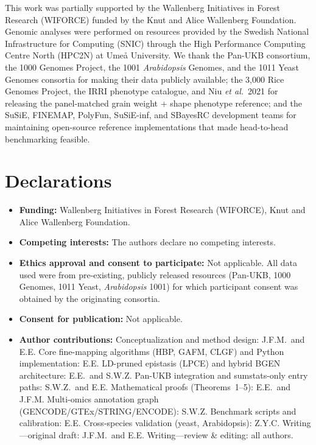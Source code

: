 \documentclass[pdflatex,sn-nature]{sn-jnl}
\begin{document}

This work was partially supported by the Wallenberg Initiatives in
Forest Research (WIFORCE) funded by the Knut and Alice Wallenberg
Foundation. Genomic analyses were performed on resources provided by
the Swedish National Infrastructure for Computing (SNIC) through the
High Performance Computing Centre North (HPC2N) at Ume\aa{}
University. We thank the Pan-UKB consortium, the 1000 Genomes
Project, the 1001 \emph{Arabidopsis} Genomes, and the 1011 Yeast
Genomes consortia for making their data publicly available; the
3{,}000 Rice Genomes Project, the IRRI phenotype catalogue, and
Niu \emph{et al.}\ 2021 for releasing the panel-matched grain
weight + shape phenotype reference; and the SuSiE, FINEMAP,
PolyFun, SuSiE-inf, and SBayesRC development teams
for maintaining open-source reference implementations that made
head-to-head benchmarking feasible.

\section*{Declarations}

\begin{itemize}
\item \textbf{Funding:} Wallenberg Initiatives in Forest Research (WIFORCE), Knut and Alice Wallenberg Foundation.
\item \textbf{Competing interests:} The authors declare no competing interests.
\item \textbf{Ethics approval and consent to participate:} Not applicable. All data used were from pre-existing, publicly released resources (Pan-UKB, 1000 Genomes, 1011 Yeast, \emph{Arabidopsis} 1001) for which participant consent was obtained by the originating consortia.
\item \textbf{Consent for publication:} Not applicable.
\item \textbf{Author contributions:} Conceptualization and method design: J.F.M.\ and E.E. Core fine-mapping algorithms (HBP, GAFM, CLGF) and Python implementation: E.E. LD-pruned epistasis (LPCE) and hybrid BGEN architecture: E.E.\ and S.W.Z. Pan-UKB integration and sumstats-only entry paths: S.W.Z.\ and E.E. Mathematical proofs (Theorems~1--5): E.E.\ and J.F.M. Multi-omics annotation graph (GENCODE/GTEx/STRING/ENCODE): S.W.Z. Benchmark scripts and calibration: E.E. Cross-species validation (yeast, Arabidopsis): Z.Y.C. Writing---original draft: J.F.M.\ and E.E. Writing---review \& editing: all authors.
\end{itemize}
\end{document}
